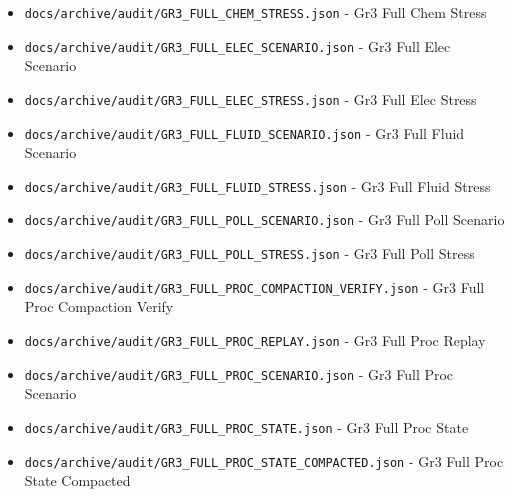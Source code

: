 \documentclass[10.5pt,a4paper,openany]{book}
\begin{document}
\begin{itemize}
\item \texttt{docs/\allowbreak{}archive/\allowbreak{}audit/\allowbreak{}GR3\_\allowbreak{}FULL\_\allowbreak{}CHEM\_\allowbreak{}STRESS.\allowbreak{}json} -\allowbreak{} Gr3 Full Chem Stress
\item \texttt{docs/\allowbreak{}archive/\allowbreak{}audit/\allowbreak{}GR3\_\allowbreak{}FULL\_\allowbreak{}ELEC\_\allowbreak{}SCENARIO.\allowbreak{}json} -\allowbreak{} Gr3 Full Elec Scenario
\item \texttt{docs/\allowbreak{}archive/\allowbreak{}audit/\allowbreak{}GR3\_\allowbreak{}FULL\_\allowbreak{}ELEC\_\allowbreak{}STRESS.\allowbreak{}json} -\allowbreak{} Gr3 Full Elec Stress
\item \texttt{docs/\allowbreak{}archive/\allowbreak{}audit/\allowbreak{}GR3\_\allowbreak{}FULL\_\allowbreak{}FLUID\_\allowbreak{}SCENARIO.\allowbreak{}json} -\allowbreak{} Gr3 Full Fluid Scenario
\item \texttt{docs/\allowbreak{}archive/\allowbreak{}audit/\allowbreak{}GR3\_\allowbreak{}FULL\_\allowbreak{}FLUID\_\allowbreak{}STRESS.\allowbreak{}json} -\allowbreak{} Gr3 Full Fluid Stress
\item \texttt{docs/\allowbreak{}archive/\allowbreak{}audit/\allowbreak{}GR3\_\allowbreak{}FULL\_\allowbreak{}POLL\_\allowbreak{}SCENARIO.\allowbreak{}json} -\allowbreak{} Gr3 Full Poll Scenario
\item \texttt{docs/\allowbreak{}archive/\allowbreak{}audit/\allowbreak{}GR3\_\allowbreak{}FULL\_\allowbreak{}POLL\_\allowbreak{}STRESS.\allowbreak{}json} -\allowbreak{} Gr3 Full Poll Stress
\item \texttt{docs/\allowbreak{}archive/\allowbreak{}audit/\allowbreak{}GR3\_\allowbreak{}FULL\_\allowbreak{}PROC\_\allowbreak{}COMPACTION\_\allowbreak{}VERIFY.\allowbreak{}json} -\allowbreak{} Gr3 Full Proc Compaction Verify
\item \texttt{docs/\allowbreak{}archive/\allowbreak{}audit/\allowbreak{}GR3\_\allowbreak{}FULL\_\allowbreak{}PROC\_\allowbreak{}REPLAY.\allowbreak{}json} -\allowbreak{} Gr3 Full Proc Replay
\item \texttt{docs/\allowbreak{}archive/\allowbreak{}audit/\allowbreak{}GR3\_\allowbreak{}FULL\_\allowbreak{}PROC\_\allowbreak{}SCENARIO.\allowbreak{}json} -\allowbreak{} Gr3 Full Proc Scenario
\item \texttt{docs/\allowbreak{}archive/\allowbreak{}audit/\allowbreak{}GR3\_\allowbreak{}FULL\_\allowbreak{}PROC\_\allowbreak{}STATE.\allowbreak{}json} -\allowbreak{} Gr3 Full Proc State
\item \texttt{docs/\allowbreak{}archive/\allowbreak{}audit/\allowbreak{}GR3\_\allowbreak{}FULL\_\allowbreak{}PROC\_\allowbreak{}STATE\_\allowbreak{}COMPACTED.\allowbreak{}json} -\allowbreak{} Gr3 Full Proc State Compacted

\end{itemize}
\end{document}
